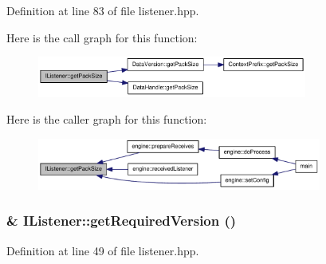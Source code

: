 Definition at line 83 of file listener.hpp.

Here is the call graph for this function:\nopagebreak
\begin{figure}[H]
\begin{center}
\leavevmode
\includegraphics[width=251pt]{class_i_listener_a8a3f4a3f3c27cd671415192b99b10a96_cgraph}
\end{center}
\end{figure}


Here is the caller graph for this function:\nopagebreak
\begin{figure}[H]
\begin{center}
\leavevmode
\includegraphics[width=265pt]{class_i_listener_a8a3f4a3f3c27cd671415192b99b10a96_icgraph}
\end{center}
\end{figure}
\hypertarget{class_i_listener_aee2a0174f44139725e4e19fdc3c4d94e}{
\subsubsection[{getRequiredVersion}]{\& IListener::getRequiredVersion ()}}
\label{class_i_listener_aee2a0174f44139725e4e19fdc3c4d94e}


Definition at line 49 of file listener.hpp.

